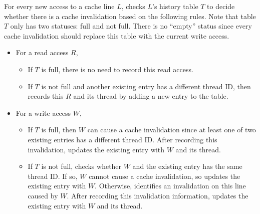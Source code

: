 \begin{comment}
\begin{table}
\centering
  \begin{tabular}{ l | r }
    \hline
    {Thread ID} & {Type of Access} \\ \hline
    \hline
     &   \\ \hline
     &   \\ \hline
  \end{tabular}
  \caption{Two-entries-cache-history table for every cache line. \label{table:cachehistory}}
\end{table} 
\end{comment}

For every new access to a cache line $L$, \Predator{} checks $L$'s
history table $T$ to decide whether there is a cache invalidation
based on the following rules.  Note that table $T$ only has two
statuses: full and not full.  There is no ``empty'' status since every
cache invalidation should replace this table with the current write
access.

\begin{itemize}
\item
  For a read access $R$, 
  \begin{itemize}
    \item
      If $T$ is full, there is no need to record this read access.
    \item
      If $T$ is not full and another existing entry has a different thread
      ID, then \Predator{} records this $R$ and its thread by adding a new entry to the table. 
  \end{itemize}
\item
  For a write access $W$, 
  \begin{itemize}
    \item
      If $T$ is full, then $W$ can cause a cache invalidation since at least 
      one of two existing entries has a different thread ID.
      After recording this invalidation, \Predator{} updates the
      existing entry with $W$ and its thread.
    \item
      If $T$ is not full,
      \Predator{} checks whether $W$ and the existing entry has the same thread ID. If
      so, $W$ cannot cause a cache invalidation, so \Predator{} updates the existing
      entry with $W$. Otherwise, \Predator{} identifies an invalidation on this line caused by $W$. 
      After recording this invalidation information, \Predator{} updates the
      existing entry with $W$ and its thread.
  \end{itemize}
\end{itemize}

